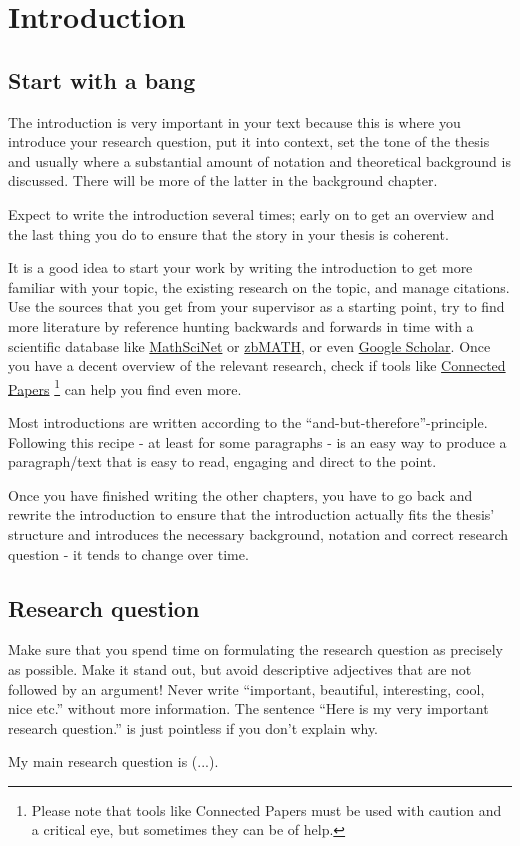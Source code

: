 \chapter{Introduction}
\label{intro}

\section{Start with a bang}
The introduction is very important in your text because this is where you introduce your research question, put it into context, set the tone of the thesis and usually where a substantial amount of notation and theoretical background is discussed. There will be more of the latter in the background chapter.

Expect to write the introduction several times; early on to get an overview and the last thing you do to ensure that the story in your thesis is coherent.

It is a good idea to start your work by writing the introduction to get more familiar with your topic, the existing research on the topic, and manage citations. Use the sources that you get from your supervisor as a starting point, try to find more literature by reference hunting backwards and forwards in time with a scientific database like \hyperlink{https://mathscinet.ams.org/}{MathSciNet} or \hyperlink{https://zbmath.org/}{zbMATH}, or even \hyperlink{https://scholar.google.com/}{Google Scholar}. Once you have a decent overview of the relevant research, check if tools like \hyperlink{https://www.connectedpapers.com/}{Connected Papers} \footnote{Please note that tools like Connected Papers must be used with caution and a critical eye, but sometimes they can be of help.} can help you find even more.

Most introductions are written according to the \enquote{and-but-therefore}-principle. Following this recipe - at least for some paragraphs - is an easy way to produce a paragraph/text that is easy to read, engaging and direct to the point.

Once you have finished writing the other chapters, you have to go back and rewrite the introduction to ensure that the introduction actually fits the thesis' structure and introduces the necessary background, notation and correct research question - it tends to change over time.

\section{Research question}
Make sure that you spend time on formulating the research question as precisely as possible. Make it stand out, but avoid descriptive adjectives that are not followed by an argument! Never write \enquote{important, beautiful, interesting, cool, nice etc.} without more information. The sentence \enquote{Here is my very important research question.} is just pointless if you don't explain why.
\begin{question}
    My main research question is (...). 
\end{question}

